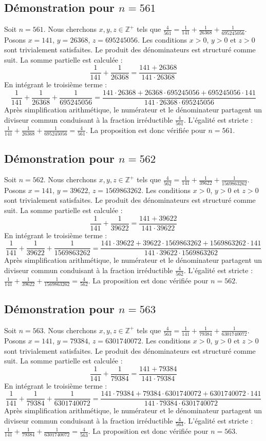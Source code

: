 \documentclass[11pt,a4paper]{article}
\begin{document}
\subsection{Démonstration pour $n = 561$}
Soit $n = 561$. Nous cherchons $x, y, z \in \mathbb{Z}^{+}$ tels que $\frac{4}{561} = \frac{1}{141} + \frac{1}{26368} + \frac{1}{695245056}$.
Posons $x = 141$, $y = 26368$, $z = 695245056$.
Les conditions $x > 0$, $y > 0$ et $z > 0$ sont trivialement satisfaites.
Le produit des dénominateurs est structuré comme suit. La somme partielle est calculée :
$$ \frac{1}{141} + \frac{1}{26368} = \frac{141+26368}{141 \cdot 26368} $$
En intégrant le troisième terme :
$$ \frac{1}{141} + \frac{1}{26368} + \frac{1}{695245056} = \frac{141 \cdot 26368 + 26368 \cdot 695245056 + 695245056 \cdot 141}{141 \cdot 26368 \cdot 695245056} $$
Après simplification arithmétique, le numérateur et le dénominateur partagent un diviseur commun conduisant à la fraction irréductible $\frac{4}{561}$.
L'égalité est stricte : $\frac{1}{141} + \frac{1}{26368} + \frac{1}{695245056} = \frac{4}{561}$.
La proposition est donc vérifiée pour $n = 561$.
\subsection{Démonstration pour $n = 562$}
Soit $n = 562$. Nous cherchons $x, y, z \in \mathbb{Z}^{+}$ tels que $\frac{4}{562} = \frac{1}{141} + \frac{1}{39622} + \frac{1}{1569863262}$.
Posons $x = 141$, $y = 39622$, $z = 1569863262$.
Les conditions $x > 0$, $y > 0$ et $z > 0$ sont trivialement satisfaites.
Le produit des dénominateurs est structuré comme suit. La somme partielle est calculée :
$$ \frac{1}{141} + \frac{1}{39622} = \frac{141+39622}{141 \cdot 39622} $$
En intégrant le troisième terme :
$$ \frac{1}{141} + \frac{1}{39622} + \frac{1}{1569863262} = \frac{141 \cdot 39622 + 39622 \cdot 1569863262 + 1569863262 \cdot 141}{141 \cdot 39622 \cdot 1569863262} $$
Après simplification arithmétique, le numérateur et le dénominateur partagent un diviseur commun conduisant à la fraction irréductible $\frac{4}{562}$.
L'égalité est stricte : $\frac{1}{141} + \frac{1}{39622} + \frac{1}{1569863262} = \frac{4}{562}$.
La proposition est donc vérifiée pour $n = 562$.
\subsection{Démonstration pour $n = 563$}
Soit $n = 563$. Nous cherchons $x, y, z \in \mathbb{Z}^{+}$ tels que $\frac{4}{563} = \frac{1}{141} + \frac{1}{79384} + \frac{1}{6301740072}$.
Posons $x = 141$, $y = 79384$, $z = 6301740072$.
Les conditions $x > 0$, $y > 0$ et $z > 0$ sont trivialement satisfaites.
Le produit des dénominateurs est structuré comme suit. La somme partielle est calculée :
$$ \frac{1}{141} + \frac{1}{79384} = \frac{141+79384}{141 \cdot 79384} $$
En intégrant le troisième terme :
$$ \frac{1}{141} + \frac{1}{79384} + \frac{1}{6301740072} = \frac{141 \cdot 79384 + 79384 \cdot 6301740072 + 6301740072 \cdot 141}{141 \cdot 79384 \cdot 6301740072} $$
Après simplification arithmétique, le numérateur et le dénominateur partagent un diviseur commun conduisant à la fraction irréductible $\frac{4}{563}$.
L'égalité est stricte : $\frac{1}{141} + \frac{1}{79384} + \frac{1}{6301740072} = \frac{4}{563}$.
La proposition est donc vérifiée pour $n = 563$.
\end{document}
